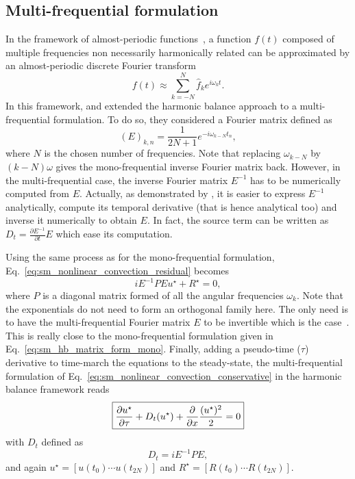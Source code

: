 \subsection{Multi-frequential formulation}
\label{sec:sm_hb_multi}
In the
framework of almost-periodic functions~\cite{Besicovitch1932},
a function $f(t)$ composed of multiple
frequencies non necessarily harmonically related can be approximated
by an almost-periodic
discrete Fourier transform
\begin{equation}
	f(t) \approx \sum_{k=-N}^{N} \widehat{f}_k 
	e^{i \omega_k t}.
\end{equation}
In this framework, \citet{Gopinath2007} and \citet{Ekici2007} 
extended the harmonic balance approach to
a multi-frequential formulation. To do so, they considered
a Fourier matrix defined as
\begin{equation}
	(E)_{k,n} = \frac{1}{2N+1} e^{-i \omega_{k-N} t_n},
\end{equation}
where $N$ is the chosen number of frequencies.
Note that replacing $\omega_{k-N}$ by $(k - N) \omega$ gives
the mono-frequential inverse Fourier matrix back. 
However, in the multi-frequential case, the inverse Fourier matrix
$E^{-1}$ has to be numerically computed from $E$. Actually, as demonstrated by 
\citet{Gopinath2007}, it is easier to express $E^{-1}$ analytically,
compute its temporal derivative (that is hence analytical too) 
and inverse it numerically to obtain $E$. In fact, the source term
can be written as $D_t = \frac{\partial E^{-1}}{\partial t} E$
which ease its computation.

Using the same process as for the mono-frequential formulation,
Eq.~\eqref{eq:sm_nonlinear_convection_residual} becomes
\begin{equation}
	i E^{-1} P E u^\star + R^\star = 0,
\end{equation}
where $P$ is a diagonal matrix formed of all the angular frequencies $\omega_k$.
Note that the exponentials do not need to form an
orthogonal family here. The only need is to have the multi-frequential
Fourier matrix $E$ to be invertible which is the case~\cite{Ekici2007}.
This is really close to the mono-frequential formulation given
in Eq.~\eqref{eq:sm_hb_matrix_form_mono}.
Finally, adding a pseudo-time ($\tau$) derivative 
to time-march the equations to the steady-state,
the multi-frequential formulation of 
Eq.~\eqref{eq:sm_nonlinear_convection_conservative} in the harmonic
balance framework reads
\begin{equation}
	\fbox{$
	\displaystyle \frac{\partial u^\star}{\partial \tau} +
	D_t (u^\star) + 
	\displaystyle \frac{\partial}{\partial x}
		\frac{(u^\star)^2}{2} = 0
	$}
\end{equation}
with $D_t$ defined as
\begin{equation}
	D_t = i E^{-1} P E,
	\label{eq:sm_multi_spectral_operator}
\end{equation}
and again $u^\star = [u(t_0) \cdots u(t_{2N})]$ 
and $R^\star = [R(t_0) \cdots R(t_{2N})]$.

